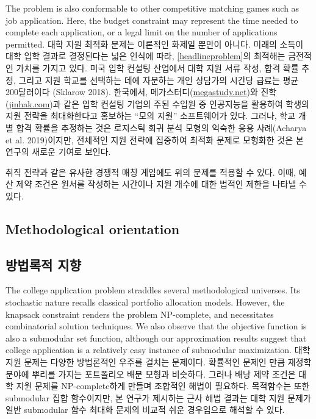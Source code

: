 \documentclass[11pt]{article} %
\theoremstyle{definition}
\theoremstyle{definition}
\begin{document}
The problem is also conformable to other competitive matching games such as job application. Here, the budget constraint may represent the time needed to complete each application, or a legal limit on the number of applications permitted.
\else
대학 지원 최적화 문제는 이론적인 화제일 뿐만이 아니다. 미래의 소득이 대학 입학 결과로 결정된다는 넓은 인식에 따라, \eqref{headlineproblem}의 최적해는 금전적인 가치를 가지고 있다. 미국 입학 컨설팅 산업에서 대학 지원 서류 작성, 합격 확률 추정, 그리고 지원 학교를 선택하는 데에 자문하는 개인 상담가의 시간당 급료는 평균 200달러이다 (Sklarow 2018). 한국에서, 메가스터디(\url{megastudy.net})와 진학(\url{jinhak.com})과 같은 입학 컨설팅 기업의 주된 수입원 중 인공지능을 활용하여 학생의 지원 전략을 최대화한다고 홍보하는 ``모의 지원'' 소프트웨어가 있다. 그러나, 학교 개별 합격 확률을 추정하는 것은 로지스틱 회귀 분석 모형의 익숙한 응용 사례(Acharya et al. 2019)이지만, 전체적인 지원 전략에 집중하여 최적화 문제로 모형화한 것은 본 연구의 새로운 기여로 보인다.

취직 전략과 같은 유사한 경쟁적 매칭 게임에도 위의 문제를 적용할 수 있다. 이때, 예산 제약 조건은 원서를 작성하는 시간이나 지원 개수에 대한 법적인 제한을 나타낼 수 있다.
\fi


\ifen \subsection{Methodological orientation} \else \subsection{방법록적 지향} \fi
\ifen
The college application problem straddles several methodological universes. Its stochastic nature recalls classical portfolio allocation models. However, the knapsack constraint renders the problem NP-complete, and necessitates combinatorial solution techniques. We also observe that the objective function is also a submodular set function, although our approximation results suggest that college application is a relatively easy instance of submodular maximization.
\else
대학 지원 문제는 다양한 방법론적인 우주를 걸치는 문제이다.  확률적인 문제인 만큼 재정학 분야에 뿌리를 가지는 포트폴리오 배분 모형과 비슷하다. 그러나 배낭 제약 조건은 대학 지원 문제를 NP-complete하게 만들며 조합적인 해법이 필요하다. 목적함수는 또한 submodular 집합 함수이지만, 본 연구가 제시하는 근사 해법 결과는 대학 지원 문제가 일반 submodular 함수 최대화 문제의 비교적 쉬운 경우임으로 해석할 수 있다.
\fi
\end{document}
